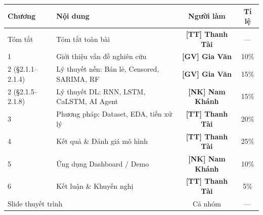 \documentclass[12pt,a4paper]{report}
\newcommand{\ownerGV}{\colorbox{green!20}{\textbf{[GV] Gia Văn}}}
\newcommand{\ownerNK}{\colorbox{blue!15}{\textbf{[NK] Nam Khánh}}}
\newcommand{\ownerTT}{\colorbox{red!15}{\textbf{[TT] Thanh Tài}}}
\begin{document}
\begin{tcolorbox}[colback=gray!5, colframe=black!60,
    title=\bfseries Phân công theo chương (tổng quan)]
\begin{tabularx}{\textwidth}{|l|X|c|c|}
\hline
\textbf{Chương} & \textbf{Nội dung} & \textbf{Người làm} & \textbf{Tỉ lệ} \\
\hline
Tóm tắt              & Tóm tắt toàn bài                              & \ownerTT       & ---  \\
\hline
1                    & Giới thiệu vấn đề nghiên cứu                  & \ownerGV       & 10\% \\
\hline
2 (§2.1.1–2.1.4)    & Lý thuyết nền: Bán lẻ, Censored, SARIMA, RF  & \ownerGV       & 15\% \\
\hline
2 (§2.1.5–2.1.8)    & Lý thuyết DL: RNN, LSTM, CaLSTM, AI Agent    & \ownerNK       & 15\% \\
\hline
3                    & Phương pháp: Dataset, EDA, tiền xử lý        & \ownerTT       & 20\% \\
\hline
4                    & Kết quả \& Đánh giá mô hình                  & \ownerTT       & 25\% \\
\hline
5                    & Ứng dụng Dashboard / Demo                    & \ownerNK       & 10\% \\
\hline
6                    & Kết luận \& Khuyến nghị                      & \ownerTT       & 5\%  \\
\hline
\multicolumn{2}{|l|}{Slide thuyết trình}                       & Cả nhóm        & ---  \\
\hline
\end{tabularx}
\end{tcolorbox}

\bigskip
\end{document}
